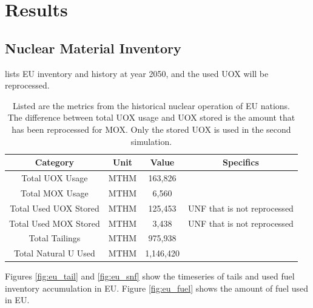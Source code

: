 \section{Results}

\subsection{Nuclear Material Inventory}

 lists  \gls{EU} inventory and
history at year 2050, and the used \gls{UOX} will be
reprocessed.

\begin{table}[h]
	\centering
		\begin{tabular}{cccc}
			\hline
			\textbf{Category} & \textbf{Unit} & \textbf{Value} & \textbf{Specifics}\\ 
			\hline
			Total UOX Usage & MTHM & 163,826 &  \\ 
			Total MOX Usage & MTHM & 6,560 & \\ 
			Total Used UOX Stored & MTHM & 125,453 & \gls{UNF} that is not reprocessed\\ 
			Total Used  MOX Stored & MTHM & 3,438 & \gls{UNF} that is not reprocessed \\ 
			Total Tailings & MTHM & 975,938 & \\ 
			Total Natural U Used & MTHM & 1,146,420 & \\ \hline
		\end{tabular}
		\caption{Listed are the metrics from the historical nuclear operation of \gls{EU} nations.
				 The difference between total \gls{UOX} usage and \gls{UOX} stored is the amount
				 that has been reprocessed for \gls{MOX}. Only the stored \gls{UOX} is used in the 
				 second simulation.}
		\label{tab:sim_result}
\end {table}
\FloatBarrier


Figures \ref{fig:eu_tail} and \ref{fig:eu_snf} show the 
timeseries of tails and used fuel inventory accumulation in \gls{EU}.
Figure \ref{fig:eu_fuel} shows the amount of fuel used in \gls{EU}.


